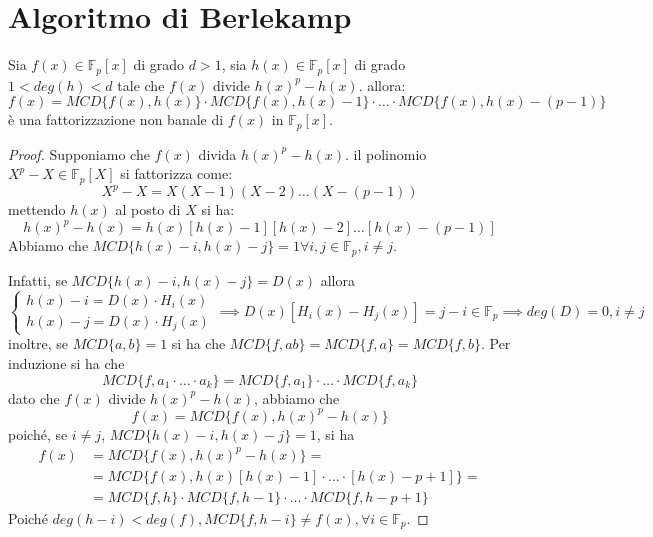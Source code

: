 \documentclass[../main.tex]{subfiles}
\begin{document}
\section{Algoritmo di Berlekamp}
\begin{theorem}
    Sia $f(x) \in \mathbb{F}_p[x]$ di grado $d > 1$, sia $h(x) \in \mathbb{F}_p[x]$ di grado $1 < deg(h) < d$ tale che $f(x)$ divide $h(x)^p - h(x)$. allora:
    \begin{equation*}
        f(x) = MCD\{f(x), h(x)\} \cdot MCD\{f(x), h(x) - 1\} \cdot \ldots \cdot MCD\{f(x), h(x) - (p - 1)\}
    \end{equation*}
    è una fattorizzazione non banale di $f(x)$ in $\mathbb{F}_p[x]$.
\end{theorem}
\begin{proof}
    Supponiamo che $f(x)$ divida $h(x)^p - h(x)$. il polinomio $X^p - X \in \mathbb{F}_p[X]$ si fattorizza come:
    \begin{equation*}
        X^p - X = X(X - 1)(X - 2)\ldots(X - (p - 1))
    \end{equation*}
    mettendo $h(x)$ al posto di $X$ si ha:
    \begin{equation*}
        h(x)^p - h(x) = h(x)[h(x) - 1][h(x) - 2]\ldots[h(x) - (p - 1)]
    \end{equation*}
    Abbiamo che $MCD\{ h(x) - i, h(x) - j\} = 1 \forall i,j \in \mathbb{F}_p, i \neq j$.

    Infatti, se $MCD\{ h(x) - i, h(x) - j\} = D(x)$ allora
    \begin{equation*}
        \begin{cases}
            h(x) - i = D(x) \cdot H_i(x) \\
            h(x) - j = D(x) \cdot H_j(x)
        \end{cases}
        \implies D(x)[H_i(x) - H_j(x)] = j - i \in \mathbb{F}_p
        \implies deg(D) = 0, i \neq j
    \end{equation*}
    inoltre, se $ MCD\{ a, b\} = 1$ si ha che $MCD\{ f, ab\} = MCD\{ f, a\} = MCD\{ f, b\} $. Per induzione si ha che
    \begin{equation*}
        MCD\{ f, a_1 \cdot \ldots \cdot a_k\} = MCD\{ f, a_1\} \cdot \ldots \cdot MCD\{ f, a_k\}
    \end{equation*}
    dato che $f(x)$ divide $h(x)^p - h(x)$, abbiamo che
    \begin{equation*}
        f(x) = MCD\{ f(x), h(x)^p - h(x)\}
    \end{equation*}
    poiché, se $i \neq j$, $MCD\{ h(x) - i, h(x) - j\} = 1$, si ha
    \begin{align*}
        f(x) & = MCD\{ f(x), h(x)^p - h(x)\} =                                               \\
             & = MCD\{ f(x), h(x)[h(x) - 1] \cdot \ldots \cdot [h(x) - p + 1]\} =            \\
             & = MCD\{ f, h\} \cdot MCD\{ f, h - 1\} \cdot \ldots \cdot MCD\{ f, h - p + 1\}
    \end{align*}
    Poiché $deg(h - i) < deg(f), MCD\{f, h - i\} \neq f(x), \forall i \in \mathbb{F}_p$.


\end{proof}
\end{document}
